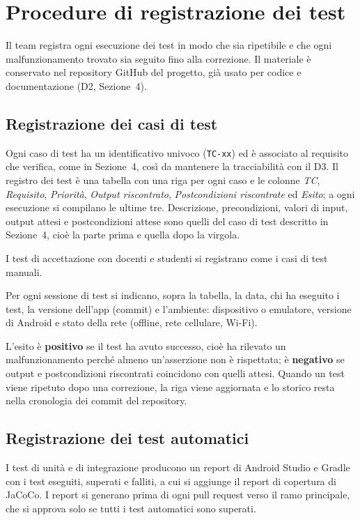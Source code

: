 \section{Procedure di registrazione dei test}

Il team registra ogni esecuzione dei test in modo che sia ripetibile e che ogni malfunzionamento trovato sia seguito fino alla correzione. Il materiale è conservato nel repository GitHub del progetto, già usato per codice e documentazione (D2, Sezione~4).

\subsection{Registrazione dei casi di test}

Ogni caso di test ha un identificativo univoco (\texttt{TC-xx}) ed è associato al requisito che verifica, come in Sezione~4, così da mantenere la tracciabilità con il D3. Il registro dei test è una tabella con una riga per ogni caso e le colonne \emph{TC}, \emph{Requisito}, \emph{Priorità}, \emph{Output riscontrato}, \emph{Postcondizioni riscontrate} ed \emph{Esito}; a ogni esecuzione si compilano le ultime tre. Descrizione, precondizioni, valori di input, output attesi e postcondizioni attese sono quelli del caso di test descritto in Sezione~4, cioè la parte prima e quella dopo la virgola.

I test di accettazione con docenti e studenti si registrano come i casi di test manuali.

Per ogni sessione di test si indicano, sopra la tabella, la data, chi ha eseguito i test, la versione dell'app (commit) e l'ambiente: dispositivo o emulatore, versione di Android e stato della rete (offline, rete cellulare, Wi-Fi).

L'esito è \textbf{positivo} se il test ha avuto successo, cioè ha rilevato un malfunzionamento perché almeno un'asserzione non è rispettata; è \textbf{negativo} se output e postcondizioni riscontrati coincidono con quelli attesi. Quando un test viene ripetuto dopo una correzione, la riga viene aggiornata e lo storico resta nella cronologia dei commit del repository.

\subsection{Registrazione dei test automatici}

I test di unità e di integrazione producono un report di Android Studio e Gradle con i test eseguiti, superati e falliti, a cui si aggiunge il report di copertura di JaCoCo. I report si generano prima di ogni pull request verso il ramo principale, che si approva solo se tutti i test automatici sono superati.

